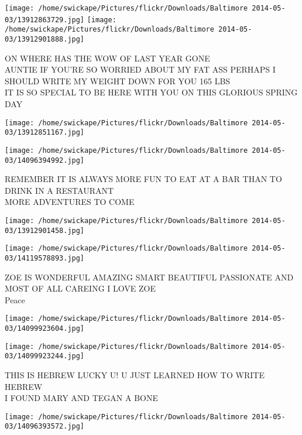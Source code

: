 \documentclass[10pt,letterpaper]{article}
\begin{document}
\vspace{0.25in}
\texttt{[image: /home/swickape/Pictures/flickr/Downloads/Baltimore 2014-05-03/13912863729.jpg]}
\texttt{[image: /home/swickape/Pictures/flickr/Downloads/Baltimore 2014-05-03/13912901888.jpg]}

ON WHERE HAS THE WOW OF LAST YEAR GONE\\
AUNTIE IF YOU'RE SO WORRIED ABOUT MY FAT ASS PERHAPS I SHOULD WRITE MY WEIGHT DOWN  FOR YOU 165 LBS\\
IT IS SO SPECIAL TO BE HERE WITH YOU ON THIS GLORIOUS SPRING DAY\\
\pagebreak

\texttt{[image: /home/swickape/Pictures/flickr/Downloads/Baltimore 2014-05-03/13912851167.jpg]}

\vspace{0.25in}
\texttt{[image: /home/swickape/Pictures/flickr/Downloads/Baltimore 2014-05-03/14096394992.jpg]}

REMEMBER IT IS ALWAYS MORE FUN TO EAT AT A BAR THAN TO DRINK IN A RESTAURANT\\
MORE ADVENTURES TO COME\\
\pagebreak

\texttt{[image: /home/swickape/Pictures/flickr/Downloads/Baltimore 2014-05-03/13912901458.jpg]}

\vspace{0.25in}
\texttt{[image: /home/swickape/Pictures/flickr/Downloads/Baltimore 2014-05-03/14119578893.jpg]}

ZOE IS WONDERFUL AMAZING SMART BEAUTIFUL PASSIONATE AND MOST OF ALL CAREING I LOVE ZOE\\
Peace\\
\pagebreak

\texttt{[image: /home/swickape/Pictures/flickr/Downloads/Baltimore 2014-05-03/14099923604.jpg]}

\vspace{0.25in}
\texttt{[image: /home/swickape/Pictures/flickr/Downloads/Baltimore 2014-05-03/14099923244.jpg]}

THIS IS HEBREW LUCKY U! U JUST LEARNED HOW TO WRITE HEBREW\\
I FOUND MARY AND TEGAN A BONE\\
\pagebreak

\texttt{[image: /home/swickape/Pictures/flickr/Downloads/Baltimore 2014-05-03/14096393572.jpg]}
\end{document}
